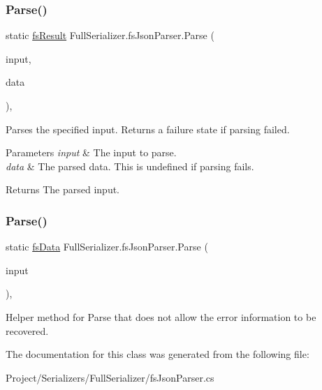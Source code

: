 \subsubsection{\texorpdfstring{Parse()}{Parse()}\hspace{0.1cm}{\footnotesize\ttfamily [1/2]}}
{\footnotesize\ttfamily static \hyperlink{struct_full_serializer_1_1fs_result}{fs\+Result} Full\+Serializer.\+fs\+Json\+Parser.\+Parse (\begin{DoxyParamCaption}\item[{string}]{input,  }\item[{out \hyperlink{class_full_serializer_1_1fs_data}{fs\+Data}}]{data }\end{DoxyParamCaption})\hspace{0.3cm}{\ttfamily [inline]}, {\ttfamily [static]}}



Parses the specified input. Returns a failure state if parsing failed. 


\begin{DoxyParams}{Parameters}
{\em input} & The input to parse.\\
\hline
{\em data} & The parsed data. This is undefined if parsing fails.\\
\hline
\end{DoxyParams}
\begin{DoxyReturn}{Returns}
The parsed input.
\end{DoxyReturn}
\mbox{\label{class_full_serializer_1_1fs_json_parser_a8becf3dc1005e717f5dc45e8044006a4}} 
\subsubsection{\texorpdfstring{Parse()}{Parse()}\hspace{0.1cm}{\footnotesize\ttfamily [2/2]}}
{\footnotesize\ttfamily static \hyperlink{class_full_serializer_1_1fs_data}{fs\+Data} Full\+Serializer.\+fs\+Json\+Parser.\+Parse (\begin{DoxyParamCaption}\item[{string}]{input }\end{DoxyParamCaption})\hspace{0.3cm}{\ttfamily [inline]}, {\ttfamily [static]}}



Helper method for Parse that does not allow the error information to be recovered. 



The documentation for this class was generated from the following file\+:\begin{DoxyCompactItemize}
\item 
Project/\+Serializers/\+Full\+Serializer/fs\+Json\+Parser.\+cs\end{DoxyCompactItemize}
